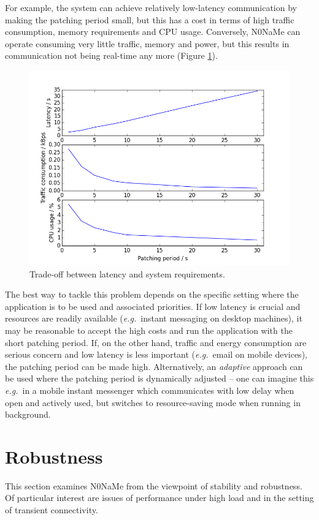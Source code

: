 \documentclass[a4paper, twoside, 12pt]{report}
\newcommand{\funkytt}{\fontfamily{AnonymousPro}\selectfont}
\begin{document}
For example, the system can achieve relatively low-latency communication by making the patching period small, but this has a cost in terms of high traffic consumption, memory requirements and CPU usage. Conversely, {\funkytt N0NaMe} can operate consuming very little traffic, memory and power, but this results in communication not being real-time any more (Figure \ref{fig:key_tradeoff}). 

\begin{figure}[H]
    \captionsetup{width=0.9\textwidth}
    \centering
    \includegraphics[width=0.7\linewidth]{pics/eval/key_tradeoff.png}
    \caption{\label{fig:key_tradeoff} Trade-off between latency and system requirements.}
\end{figure}

\restoregeometry

The best way to tackle this problem depends on the specific setting where the application is to be used and associated priorities. If low latency is crucial and resources are readily available (\textit{e.g.}~instant messaging on desktop machines), it may be reasonable to accept the high costs and run the application with the short patching period. If, on the other hand, traffic and energy consumption are serious concern and low latency is less important (\textit{e.g.}~email on mobile devices), the patching period can be made high. Alternatively, an \emph{adaptive} approach can be used where the patching period is dynamically adjusted -- one can imagine this \emph{e.g.}~in a mobile instant messenger which communicates with low delay when open and actively used, but switches to resource-saving mode when running in background.

\section{Robustness}
\label{sec:eval.robust}
This section examines {\funkytt N0NaMe} from the viewpoint of stability and robustness. Of particular interest are issues of performance under high load and in the setting of transient connectivity.
\end{document}
